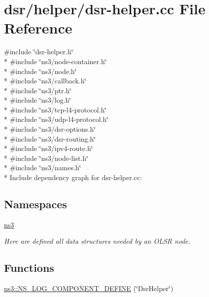 \hypertarget{dsr-helper_8cc}{}\section{dsr/helper/dsr-\/helper.cc File Reference}
\label{dsr-helper_8cc}
{\ttfamily \#include \char`\"{}dsr-\/helper.\+h\char`\"{}}\\*
{\ttfamily \#include \char`\"{}ns3/node-\/container.\+h\char`\"{}}\\*
{\ttfamily \#include \char`\"{}ns3/node.\+h\char`\"{}}\\*
{\ttfamily \#include \char`\"{}ns3/callback.\+h\char`\"{}}\\*
{\ttfamily \#include \char`\"{}ns3/ptr.\+h\char`\"{}}\\*
{\ttfamily \#include \char`\"{}ns3/log.\+h\char`\"{}}\\*
{\ttfamily \#include \char`\"{}ns3/tcp-\/l4-\/protocol.\+h\char`\"{}}\\*
{\ttfamily \#include \char`\"{}ns3/udp-\/l4-\/protocol.\+h\char`\"{}}\\*
{\ttfamily \#include \char`\"{}ns3/dsr-\/options.\+h\char`\"{}}\\*
{\ttfamily \#include \char`\"{}ns3/dsr-\/routing.\+h\char`\"{}}\\*
{\ttfamily \#include \char`\"{}ns3/ipv4-\/route.\+h\char`\"{}}\\*
{\ttfamily \#include \char`\"{}ns3/node-\/list.\+h\char`\"{}}\\*
{\ttfamily \#include \char`\"{}ns3/names.\+h\char`\"{}}\\*
Include dependency graph for dsr-\/helper.cc\+:
\subsection*{Namespaces}
\begin{DoxyCompactItemize}
\item 
 \hyperlink{namespacens3}{ns3}
\begin{DoxyCompactList}\small\item\em Here are defined all data structures needed by an O\+L\+SR node. \end{DoxyCompactList}\end{DoxyCompactItemize}
\subsection*{Functions}
\begin{DoxyCompactItemize}
\item 
\hyperlink{namespacens3_aa56b67333f470bb3a8dd3d8be01a0e42}{ns3\+::\+N\+S\+\_\+\+L\+O\+G\+\_\+\+C\+O\+M\+P\+O\+N\+E\+N\+T\+\_\+\+D\+E\+F\+I\+NE} (\char`\"{}Dsr\+Helper\char`\"{})
\end{DoxyCompactItemize}
